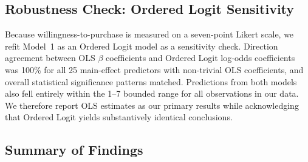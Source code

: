 \subsection{Robustness Check: Ordered Logit Sensitivity}\label{subsec:robustness}

Because willingness-to-purchase is measured on a seven-point Likert scale, we refit Model~1 as an Ordered Logit model \citep{agresti2010} as a sensitivity check. Direction agreement between OLS $\beta$ coefficients and Ordered Logit log-odds coefficients was 100\% for all 25 main-effect predictors with non-trivial OLS coefficients, and overall statistical significance patterns matched. Predictions from both models also fell entirely within the 1--7 bounded range for all observations in our data. We therefore report OLS estimates as our primary results while acknowledging that Ordered Logit yields substantively identical conclusions.

\subsection{Summary of Findings}\label{subsec:summary}

